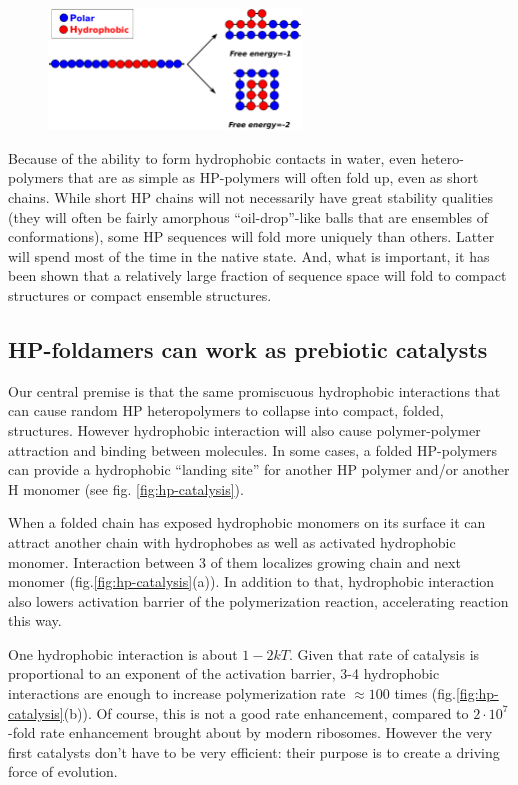\documentclass[12pt]{paper}
\begin{document}
\begin{figure}[h!]
  \centering
  \includegraphics[width=0.6\textwidth]{pictures/hp-model.pdf} 
  \caption{}
  \label{fig:hp-model}
\end{figure}
Because of the ability to form hydrophobic contacts in water, even hetero-polymers that 
are as simple as HP-polymers will often fold up, even as short chains. 
While short HP chains will not necessarily have great stability qualities (they will often be 
fairly amorphous ``oil-drop''-like balls that are ensembles of conformations), some HP 
sequences will fold more uniquely than others. Latter will spend most of the time in the native 
state. And, what is important, it has been shown that a 
relatively large fraction of sequence space will fold to compact structures or compact ensemble 
structures\cite{lau1989lattice}.

\subsection{HP-foldamers can work as prebiotic catalysts}
Our central premise is that the same promiscuous hydrophobic interactions that can cause random 
HP heteropolymers to collapse into compact, folded, structures. However hydrophobic 
interaction will also cause polymer-polymer attraction and binding between molecules.  In some 
cases, a folded HP-polymers can provide a hydrophobic ``landing site'' for another HP polymer 
and/or another H monomer (see fig. \ref{fig:hp-catalysis}).  


When a folded chain has exposed hydrophobic monomers on its surface it can attract another chain 
with hydrophobes as well as activated hydrophobic monomer. Interaction between 3 of them localizes 
growing chain and next monomer (fig.\ref{fig:hp-catalysis}(a)). In addition to that, hydrophobic 
interaction also lowers activation barrier of the polymerization reaction, accelerating reaction 
this way.

One hydrophobic interaction is about $1-2kT$. Given that rate of catalysis is proportional to an 
exponent of the activation barrier, 3-4 hydrophobic interactions are enough to increase 
polymerization rate $\approx 100$ times (fig.\ref{fig:hp-catalysis}(b)). 
Of course, this is not a good rate enhancement, compared to $2\cdot10^7$-fold rate enhancement 
brought about
by modern ribosomes\cite{Sievers2004a}. However the very 
first catalysts don't have to be very efficient: their purpose is to create a driving force of 
evolution.
\end{document}
